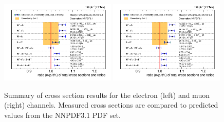 \begin{figure}[htpb]
\includegraphics[width=0.49\textwidth]{plots/Results/xsecSummary13TeV_ele.png}
\includegraphics[width=0.49\textwidth]{plots/Results/xsecSummary13TeV_muon.png}
\caption{Summary of cross section results for the \sh electron (left) and muon (right) channels. Measured cross sections are compared to predicted values from the NNPDF3.1 PDF set.}
\label{fig:xs:13}
\end{figure}
